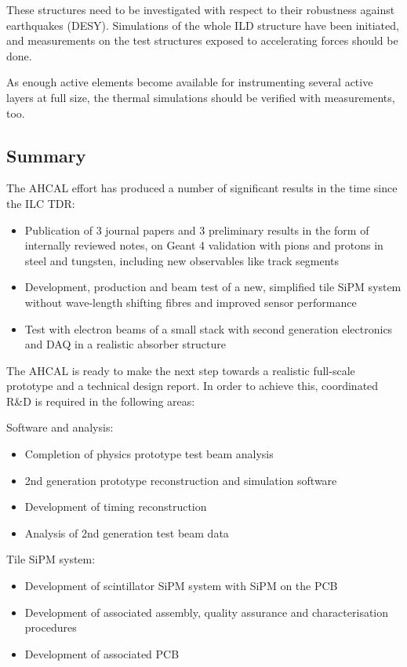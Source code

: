 These structures need to be investigated with respect to their robustness against earthquakes (DESY). Simulations of the whole ILD structure have been initiated, and measurements on the test structures exposed to accelerating forces should be done.

As enough active elements become available for instrumenting several active layers at full size, the thermal simulations should be verified with measurements, too.

\subsection{Summary}
The AHCAL effort has produced a number of significant results in the time since the ILC TDR:
\begin{itemize}
\item Publication of 3 journal papers and 3 preliminary results in the form of internally reviewed notes, on Geant 4 validation with pions and protons in steel and tungsten, including new observables like track segments
\item Development, production and beam test of a new, simplified tile SiPM system without wave-length shifting fibres and improved sensor performance
\item Test with electron beams of a small stack with second generation electronics and DAQ in a realistic absorber structure
\end{itemize}

The AHCAL is ready to make the next step towards a realistic full-scale prototype and a technical design report. In order to achieve this, coordinated R\&D is required in the following areas:

Software and analysis:
\begin{itemize}
\item Completion of physics prototype test beam analysis
\item 2nd generation prototype reconstruction and simulation software
\item Development of timing reconstruction
\item Analysis of 2nd generation test beam data
\end{itemize}

Tile SiPM system:
\begin{itemize}
\item Development of scintillator SiPM system with SiPM on the PCB
\item Development of associated assembly, quality assurance and characterisation procedures
\item Development of associated PCB
\end{itemize}

